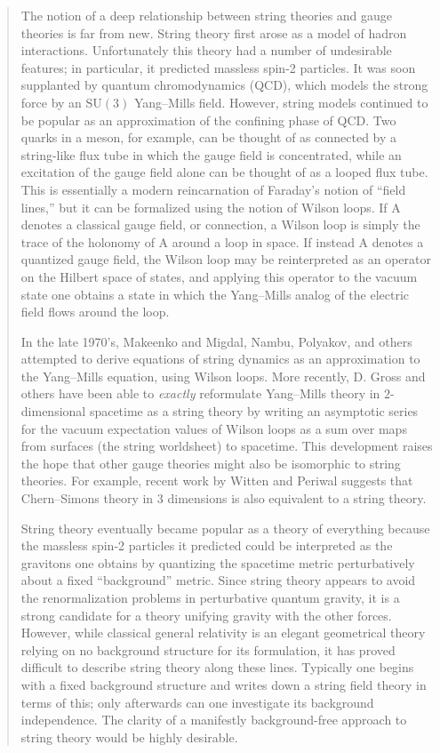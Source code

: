 \documentclass[12pt]{article}
\begin{document}
\begin{quote}
The notion of a deep relationship between string theories and gauge
theories is far from new. String theory first arose as a model of hadron
interactions. Unfortunately this theory had a number of undesirable
features; in particular, it predicted massless spin-2 particles. It was
soon supplanted by quantum chromodynamics (QCD), which models the strong
force by an \(\mathrm{SU}(3)\) Yang--Mills field. However, string models
continued to be popular as an approximation of the confining phase of
QCD. Two quarks in a meson, for example, can be thought of as connected
by a string-like flux tube in which the gauge field is concentrated,
while an excitation of the gauge field alone can be thought of as a
looped flux tube. This is essentially a modern reincarnation of
Faraday's notion of ``field lines,'' but it can be formalized using the
notion of Wilson loops. If A denotes a classical gauge field, or
connection, a Wilson loop is simply the trace of the holonomy of A
around a loop in space. If instead A denotes a quantized gauge field,
the Wilson loop may be reinterpreted as an operator on the Hilbert space
of states, and applying this operator to the vacuum state one obtains a
state in which the Yang--Mills analog of the electric field flows around
the loop.

In the late 1970's, Makeenko and Migdal, Nambu, Polyakov, and others
attempted to derive equations of string dynamics as an approximation to
the Yang--Mills equation, using Wilson loops. More recently, D. Gross and
others have been able to \emph{exactly} reformulate Yang--Mills theory in
\(2\)-dimensional spacetime as a string theory by writing an asymptotic
series for the vacuum expectation values of Wilson loops as a sum over
maps from surfaces (the string worldsheet) to spacetime. This
development raises the hope that other gauge theories might also be
isomorphic to string theories. For example, recent work by Witten and
Periwal suggests that Chern--Simons theory in 3 dimensions is also
equivalent to a string theory.

String theory eventually became popular as a theory of everything
because the massless spin-2 particles it predicted could be interpreted
as the gravitons one obtains by quantizing the spacetime metric
perturbatively about a fixed ``background'' metric. Since string theory
appears to avoid the renormalization problems in perturbative quantum
gravity, it is a strong candidate for a theory unifying gravity with the
other forces. However, while classical general relativity is an elegant
geometrical theory relying on no background structure for its
formulation, it has proved difficult to describe string theory along
these lines. Typically one begins with a fixed background structure and
writes down a string field theory in terms of this; only afterwards can
one investigate its background independence. The clarity of a manifestly
background-free approach to string theory would be highly desirable.


\end{quote}
\end{document}
